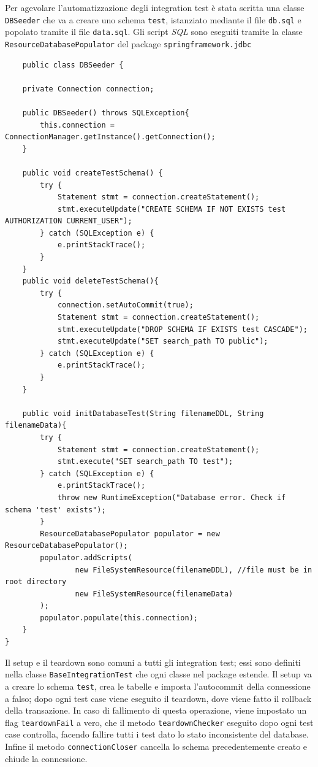 Per agevolare l'automatizzazione degli integration test è stata scritta una classe \texttt{DBSeeder} che va a creare uno schema \texttt{test}, istanziato mediante il file \texttt{db.sql} e popolato tramite il file \texttt{data.sql}. Gli script \textit{SQL} sono eseguiti tramite la classe \texttt{ResourceDatabasePopulator} del package \texttt{springframework.jdbc}
\begin{code}
    \begin{verbatim}
    public class DBSeeder {

    private Connection connection;

    public DBSeeder() throws SQLException{
        this.connection = ConnectionManager.getInstance().getConnection();
    }

    public void createTestSchema() {
        try {
            Statement stmt = connection.createStatement();
            stmt.executeUpdate("CREATE SCHEMA IF NOT EXISTS test AUTHORIZATION CURRENT_USER");
        } catch (SQLException e) {
            e.printStackTrace();
        }
    }
    public void deleteTestSchema(){
        try {
            connection.setAutoCommit(true);
            Statement stmt = connection.createStatement();
            stmt.executeUpdate("DROP SCHEMA IF EXISTS test CASCADE");
            stmt.executeUpdate("SET search_path TO public");
        } catch (SQLException e) {
            e.printStackTrace();
        }
    }

    public void initDatabaseTest(String filenameDDL, String filenameData){
        try {
            Statement stmt = connection.createStatement();
            stmt.execute("SET search_path TO test");
        } catch (SQLException e) {
            e.printStackTrace();
            throw new RuntimeException("Database error. Check if schema 'test' exists");
        }
        ResourceDatabasePopulator populator = new ResourceDatabasePopulator();
        populator.addScripts(
                new FileSystemResource(filenameDDL), //file must be in root directory
                new FileSystemResource(filenameData)
        );
        populator.populate(this.connection);
    }
}
    \end{verbatim}
\caption{Classe DBSeeder}
\end{code}
\noindent Il setup e il teardown sono comuni a tutti gli integration test; essi sono definiti nella classe \texttt{BaseIntegrationTest} che ogni classe nel package estende. Il setup va a creare lo schema \texttt{test}, crea le tabelle e imposta l'autocommit della connessione a falso; dopo ogni test case viene eseguito il teardown, dove viene fatto il rollback della transazione. In caso di fallimento di questa operazione, viene impostato un flag \texttt{teardownFail} a vero, che il metodo \texttt{teardownChecker} eseguito dopo ogni test case controlla, facendo fallire tutti i test dato lo stato inconsistente del database. Infine il metodo \texttt{connectionCloser} cancella lo schema precedentemente creato e chiude la connessione.
